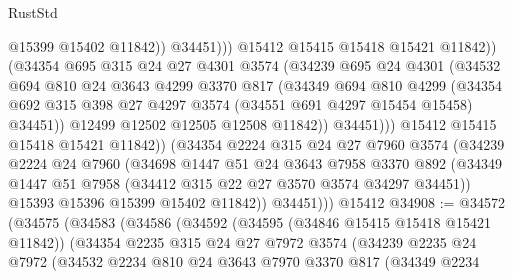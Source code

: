 \begin{lexlean}{RustStd}
\begin{coremodule}
                              @15399
                              @15402
                              @11842))
                          @34451)))
                    @15412
                    @15415
                    @15418
                    @15421
                    @11842))
                (@34354
                  @695
                  @315
                  @24
                  @27
                  @4301
                  @3574
                  (@34239
                    @695
                    @24
                    @4301
                    (@34532
                      @694
                      @810
                      @24
                      @3643
                      @4299
                      @3370
                      @817
                      (@34349
                        @694
                        @810
                        @4299
                        (@34354
                          @692
                          @315
                          @398
                          @27
                          @4297
                          @3574
                          (@34551 @691 @4297 @15454 @15458)
                          @34451))
                      @12499
                      @12502
                      @12505
                      @12508
                      @11842))
                  @34451)))
            @15412
            @15415
            @15418
            @15421
            @11842))
        (@34354
          @2224
          @315
          @24
          @27
          @7960
          @3574
          (@34239
            @2224
            @24
            @7960
            (@34698
              @1447
              @51
              @24
              @3643
              @7958
              @3370
              @892
              (@34349 @1447 @51 @7958 (@34412 @315 @22 @27 @3570 @3574 @34297 @34451))
              @15393
              @15396
              @15399
              @15402
              @11842))
          @34451)))
    @15412
@34908 := @34572
    (@34575
      (@34583
        (@34586
          (@34592
            (@34595 (@34846 @15415 @15418 @15421 @11842))
            (@34354
              @2235
              @315
              @24
              @27
              @7972
              @3574
              (@34239
                @2235
                @24
                @7972
                (@34532
                  @2234
                  @810
                  @24
                  @3643
                  @7970
                  @3370
                  @817
                  (@34349
                    @2234

\end{coremodule}
\end{lexlean}
